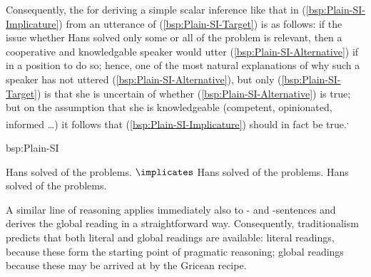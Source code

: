 \documentclass[fleqn,reqno,10pt,draft]{article}
\newcommand{\as}{\acro{as}}
\renewcommand{\es}{\acro{es}}
\begin{document}
Consequently, the 
\citep[c.f.][]{Geurts2010:Quantity-Implic} for deriving a simple scalar
inference like that in (\ref{bsp:Plain-SI-Implicature}) from an
utterance of (\ref{bsp:Plain-SI-Target}) is as follows: if the issue
whether Hans solved only some or all of the problem is relevant, then
a cooperative and knowledgable speaker would utter
(\ref{bsp:Plain-SI-Alternative}) if in a position to do so; hence, one
of the most natural explanations of why such a speaker has not uttered
(\ref{bsp:Plain-SI-Alternative}), but only (\ref{bsp:Plain-SI-Target})
is that she is uncertain of whether (\ref{bsp:Plain-SI-Alternative})
is true; but on the assumption that she is knowledgeable (competent,
opinionated, informed \dots) it follows that
(\ref{bsp:Plain-SI-Implicature}) should in fact be true.\textsuperscript{,}

\begin{exer}{bsp:Plain-SI}
  \ex 
    \begin{xlist}
      \ex \label{bsp:Plain-SI-Target} Hans solved  of the problems.
      \ex \label{bsp:Plain-SI-Implicature} $\implicates$ Hans solved
         of the problems.
      \ex  \label{bsp:Plain-SI-Alternative}  Hans solved  of the problems.
    \end{xlist}
\end{exer}

A similar line of reasoning applies immediately also to \as- and
\es-sentences and derives the global reading in a straightforward
way. Consequently, traditionalism predicts that both literal and
global readings are available: literal readings, because these form
the starting point of pragmatic reasoning; global readings because
these may be arrived at by the Gricean recipe.
\end{document}
